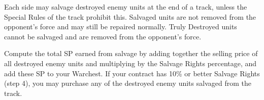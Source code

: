 Each side may salvage destroyed enemy units at the end of a track, unless the Special Rules of the track prohibit this.
Salvaged units are not removed from the opponent's force and may still be repaired normally.
Truly Destroyed units cannot be salvaged and are removed from the opponent's force.

Compute the total SP earned from salvage by adding together the selling price of all destroyed enemy units and multiplying by the Salvage Rights percentage, and add these SP to your Warchest.
If your contract has 10\% or better Salvage Rights (step 4), you may purchase any of the destroyed enemy units salvaged from the track.
